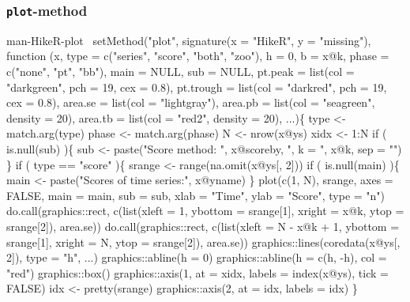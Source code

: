 \documentclass[a4paper]{article}
\begin{document}
\subsubsection{\texttt{plot}-method}

\nwenddocs{}\endmoddef
\LA{}man-HikeR-plot~{\nwtagstyle{}}\RA{}
setMethod("plot",
    signature(x = "HikeR", y = "missing"),
    function (x, type = c("series", "score", "both", "zoo"),
              h = 0, b = x@k, phase = c("none", "pt", "bb"),
              main = NULL, sub = NULL,
              pt.peak = list(col = "darkgreen", pch = 19, cex = 0.8),
              pt.trough = list(col = "darkred", pch = 19, cex = 0.8),
              area.se = list(col = "lightgray"),
              area.pb = list(col = "seagreen", density = 20),
              area.tb = list(col = "red2", density = 20),
              ...)\{
        type <- match.arg(type)
        phase <- match.arg(phase)
        N <- nrow(x@ys)
        xidx <- 1:N
        if ( is.null(sub) )\{
            sub <- paste("Score method: ", x@scoreby,
                         ", k = ", x@k, sep = "")
        \}
        if ( type == "score" )\{
            srange <- range(na.omit(x@ys[, 2]))
            if ( is.null(main) )\{
                main <- paste("Scores of time series:", x@yname)
            \}
            plot(c(1, N), srange, axes = FALSE,
                 main = main,
                 sub = sub,
                 xlab = "Time", ylab = "Score", type = "n")
            do.call(graphics::rect, c(list(xleft = 1,
                                           ybottom = srange[1],
                                           xright = x@k,
                                           ytop = srange[2]),
                                      area.se))
            do.call(graphics::rect, c(list(xleft = N - x@k + 1,
                                           ybottom = srange[1],
                                           xright = N,
                                           ytop = srange[2]),
                                      area.se))
            graphics::lines(coredata(x@ys[, 2]), type = "h", ...)
            graphics::abline(h = 0)
            graphics::abline(h = c(h, -h), col = "red")
            graphics::box()
            graphics::axis(1, at = xidx, labels = index(x@ys), tick = FALSE)
            idx <- pretty(srange)
            graphics::axis(2, at = idx, labels = idx)
        \}
\end{document}
